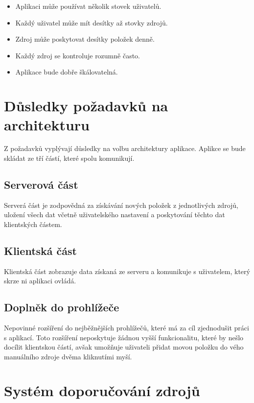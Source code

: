 \begin{itemize}
	\item Aplikaci může používat několik stovek uživatelů.
    \item Každý uživatel může mít desítky až stovky zdrojů.
	\item Zdroj může poskytovat desítky položek denně.
    \item Každý zdroj se kontroluje rozumně často.
    \item Aplikace bude dobře škálovatelná.
\end{itemize}

\section{Důsledky požadavků na architekturu}

Z požadavků vyplývají důsledky na volbu architektury aplikace.
Aplikce se bude skládat ze tří částí, které spolu komunikují.

\subsection{Serverová část}

Serverá část je zodpovědná za získávání nových položek z jednotlivých zdrojů, uložení všech dat včetně uživatelského nastavení a poskytování těchto dat klientských částem.

\subsection{Klientská část}

Klientská část zobrazuje data získaná ze serveru a komunikuje s uživatelem, který skrze ni aplikaci ovládá.

\subsection{Doplněk do prohlížeče}

Nepovinné rozšíření do nejběžnějších prohlížečů, které má za cíl zjednodušit práci s aplikací.
Toto rozšíření neposkytuje žádnou vyšší funkcionalitu, které by nešlo docílit klientskou částí, avšak umožňuje uživateli přidat movou položku do vého manuálního zdroje dvěma kliknutími myší.

\section{Systém doporučování zdrojů}

